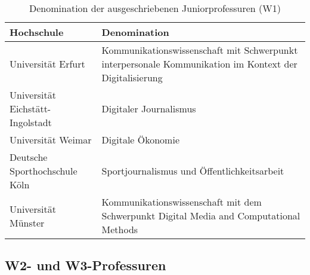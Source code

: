 \documentclass[
]{article}
\begin{document}
\begin{table}[H]

\caption{\label{tab:w1denomination}Denomination der ausgeschriebenen Juniorprofessuren (W1)}
\centering
\begin{tabular}[t]{>{\raggedright\arraybackslash}p{4cm}|>{\raggedright\arraybackslash}p{7cm}}
\hline
Hochschule & Denomination\\
\hline
Universität Erfurt & Kommunikationswissenschaft mit Schwerpunkt interpersonale Kommunikation im Kontext der Digitalisierung\\
\hline
Universität Eichstätt-Ingolstadt & Digitaler Journalismus\\
\hline
Universität Weimar & Digitale Ökonomie\\
\hline
Deutsche Sporthochschule Köln & Sportjournalismus und Öffentlichkeitsarbeit\\
\hline
Universität Münster & Kommunikationswissenschaft mit dem Schwerpunkt Digital Media and Computational Methods\\
\hline
\end{tabular}
\end{table}

\hypertarget{w2--und-w3-professuren}{%
\subsection{W2- und W3-Professuren}\label{w2--und-w3-professuren}}
\end{document}
